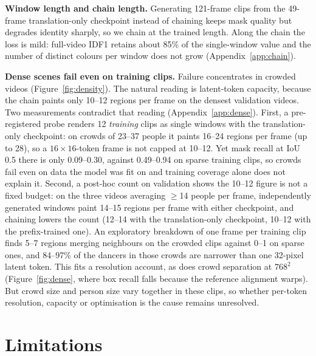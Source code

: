 \documentclass{article} %
\newcommand{\rev}[1]{{\color{blue}#1}}
\begin{document}
\textbf{Window length and chain length.} Generating 121-frame clips from the 49-frame
translation-only checkpoint instead of chaining keeps mask quality but degrades identity
sharply, so we chain at the trained length. Along the chain the loss is mild: full-video
IDF1 retains \rev{about} 85\% of the single-window value and the number of
distinct colours per window does not grow (Appendix~\ref{app:chain}).

\textbf{\rev{Dense scenes fail even on training clips.}} \rev{Failure concentrates in
crowded videos (Figure~\ref{fig:density}). The natural reading is latent-token
capacity, because the chain paints only 10--12 regions per frame on the densest validation
videos. Two measurements contradict that reading (Appendix~\ref{app:dense}). First, a
pre-registered probe renders 12 \emph{training} clips as single windows
with the translation-only checkpoint: on crowds of 23--37 people it paints 16--24 regions per
frame (up to 28), so a $16\times16$-token frame is not capped at 10--12. Yet mask recall at
IoU 0.5 there is only 0.09--0.30, against 0.49--0.94 on sparse training clips, so crowds fail
even on data the model was fit on and training coverage alone does not explain it. Second, a
post-hoc count on validation shows the 10--12 figure is not a fixed budget: on the three
videos averaging $\geq$14 people per frame, independently generated windows paint 14--15
regions per frame with either checkpoint, and chaining lowers the count (12--14 with the
translation-only checkpoint, 10--12 with the prefix-trained one). An exploratory breakdown
of one frame per training clip finds 5--7 regions merging neighbours on the crowded clips
against 0--1 on sparse ones, and 84--97\% of the dancers in those crowds are narrower than one 32-pixel latent token. This
fits a resolution account, as does crowd separation at $768^2$ (Figure~\ref{fig:dense},
where box recall falls because the reference alignment warps). But crowd size and person size vary together in these clips, so
whether per-token resolution, capacity or optimisation is the cause remains unresolved.}

\section{Limitations}
\label{sec:limitations}
\end{document}
